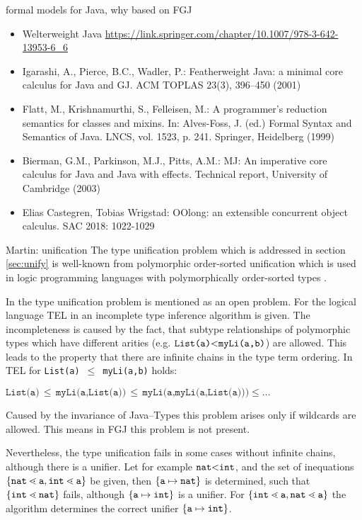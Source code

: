 
formal models for Java, why based on FGJ

\begin{itemize}
\item Welterweight Java
  \url{https://link.springer.com/chapter/10.1007/978-3-642-13953-6_6}
\item Igarashi, A., Pierce, B.C., Wadler, P.: Featherweight Java: a
  minimal core calculus for Java and GJ. ACM TOPLAS 23(3), 396–450
  (2001)
\item Flatt, M., Krishnamurthi, S., Felleisen, M.: A programmer’s
  reduction semantics for classes and mixins. In: Alves-Foss, J. (ed.)
  Formal Syntax and Semantics of Java. LNCS, vol. 1523,
  p. 241. Springer, Heidelberg (1999)
\item Bierman, G.M., Parkinson, M.J., Pitts, A.M.: MJ: An imperative
  core calculus for Java and Java with effects. Technical report,
  University of Cambridge (2003) 
\item 	Elias Castegren, Tobias Wrigstad:
OOlong: an extensible concurrent object calculus. SAC 2018: 1022-1029
\end{itemize}

Martin: unification
The type unification problem which is addressed in section \ref{sec:unify} is
well-known from polymorphic order-sorted unification which is used in logic
programming languages with polymorphically order-sorted types
\cite{GS89,MH91,HiTo92,CB95}.

 In \cite{GS89} the type unification problem
is mentioned as an open problem. For the logical language \textsf{TEL} in
\cite{GS89} an incomplete type inference algorithm is given. The incompleteness
is caused by the fact, that subtype relationships
of polymorphic types which have different arities  (e.g. $\texttt{List(a)} \mbox{$<$}
\texttt{myLi(a,b)}$) are allowed. This leads to the property that there are
infinite chains in the type term ordering. In \textsf{TEL} for \texttt{List(a)}
$\,\leq\,$ \texttt{myLi(a,b)} holds: 

\smallskip
{\centering $\texttt{List(a)} \,\leq\, \texttt{myLi(a,List(a))} \,\leq\,
\texttt{myLi(a,myLi(a,List(a)))}  \leq \ldots$\\}

Caused by the invariance of Java--Types this problem arises only if wildcards
are allowed. This means in FGJ this problem is not present.

\medskip
Nevertheless, the type unification 
fails in some cases without infinite chains, although there is a unifier. Let
for example $\texttt{nat} 
\mbox{$<$} \texttt{int}$, and the set of inequations $\{ \mathtt{nat} \lessdot \mathtt{a}, \mathtt{int}
  \lessdot \mathtt{a} \}$ be given, then $\{ \mathtt{a} \mapsto \mathtt{nat} \}$
is determined, such that 
$\{ \mathtt{int} \lessdot \mathtt{nat} \}$ fails, although $\{ \mathtt{a}\mapsto \mathtt{int} \}$ is
a unifier. For $\{ \mathtt{int} \lessdot \mathtt{a}, \mathtt{nat} \lessdot
  \mathtt{a} \}$ the algorithm determines the correct unifier
$\{ \mathtt{a}\mapsto \mathtt{int} \}$.

